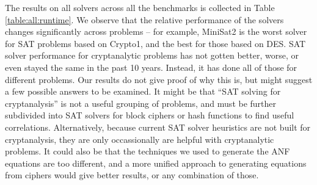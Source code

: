 The results on all solvers across all the benchmarks is collected in Table \ref{table:all:runtime}. We observe that the relative performance of the solvers changes significantly across problems -- for example, MiniSat2 is the worst solver for SAT problems based on Crypto1, and the best for those based on DES. SAT solver performance for cryptanalytic problems has not gotten better, worse, or even stayed the same in the past 10 years. Instead, it has done all of those for different problems. Our results do not give proof of why this is, but might suggest a few possible answers to be examined. It might be that ``SAT solving for cryptanalysis'' is not a useful grouping of problems, and must be further subdivided into SAT solvers for block ciphers or hash functions to find useful correlations. Alternatively, because current SAT solver heuristics are not built for cryptanalysis, they are only occassionally are helpful with cryptanalytic problems. It could also be that the techniques we used to generate the ANF equations are too different, and a more unified approach to generating equations from ciphers would give better results, or any combination of those.